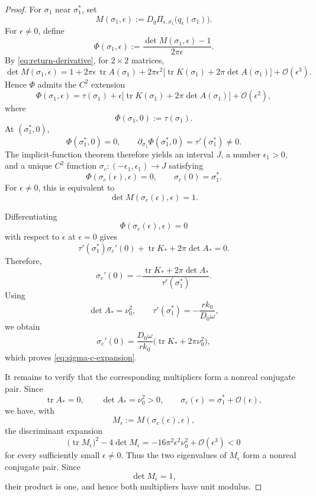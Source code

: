 \documentclass[11pt]{amsart}
\theoremstyle{remark}
\newcommand{\tr}{\operatorname{tr}}
\newcommand{\cO}{\mathcal{O}}
\begin{document}
\begin{proof}
For $\sigma_1$ near $\sigma_1^*$, set
\[
M(\sigma_1,\epsilon)
:=
D_q\Pi_{\epsilon,\sigma_1}
\bigl(q_\epsilon(\sigma_1)\bigr).
\]
For $\epsilon\ne0$, define
\[
\Phi(\sigma_1,\epsilon)
:=
\frac{\det M(\sigma_1,\epsilon)-1}{2\pi\epsilon}.
\]
By \eqref{eq:return-derivative}, for $2\times2$ matrices,
\begin{equation}
\label{eq:det-M}
\det M(\sigma_1,\epsilon)
=
1
+
2\pi\epsilon\,\tr A(\sigma_1)
+
2\pi\epsilon^2
\bigl[
\tr K(\sigma_1)+2\pi\det A(\sigma_1)
\bigr]
+
\cO(\epsilon^3).
\end{equation}
Hence $\Phi$ admits the $C^2$ extension
\begin{equation}
\label{eq:Phi}
\Phi(\sigma_1,\epsilon)
=
\tau(\sigma_1)
+
\epsilon
\bigl[
\tr K(\sigma_1)+2\pi\det A(\sigma_1)
\bigr]
+
\cO(\epsilon^2),
\end{equation}
where
\[
\Phi(\sigma_1,0):=\tau(\sigma_1).
\]
At $(\sigma_1^*,0)$,
\[
\Phi(\sigma_1^*,0)=0,
\qquad
\partial_{\sigma_1}\Phi(\sigma_1^*,0)
=
\tau'(\sigma_1^*)
\ne0.
\]
The implicit-function theorem therefore yields an interval $J$, a number
$\epsilon_1>0$, and a unique $C^2$ function
$\sigma_c:(-\epsilon_1,\epsilon_1)\to J$ satisfying
\[
\Phi(\sigma_c(\epsilon),\epsilon)=0,
\qquad
\sigma_c(0)=\sigma_1^*.
\]
For $\epsilon\ne0$, this is equivalent to
\[
\det M(\sigma_c(\epsilon),\epsilon)=1.
\]

Differentiating
\[
\Phi(\sigma_c(\epsilon),\epsilon)=0
\]
with respect to $\epsilon$ at $\epsilon=0$ gives
\[
\tau'(\sigma_1^*)\sigma_c'(0)
+
\tr K_*
+
2\pi\det A_*
=
0.
\]
Therefore,
\[
\sigma_c'(0)
=
-\frac{\tr K_*+2\pi\det A_*}
{\tau'(\sigma_1^*)}.
\]
Using
\[
\det A_*=\nu_0^2,
\qquad
\tau'(\sigma_1^*)
=
-\frac{rk_0}{D_0\omega},
\]
we obtain
\[
\sigma_c'(0)
=
\frac{D_0\omega}{rk_0}
\bigl(\tr K_*+2\pi\nu_0^2\bigr),
\]
which proves \eqref{eq:sigma-c-expansion}.

It remains to verify that the corresponding multipliers form a nonreal
conjugate pair. Since
\[
\tr A_*=0,
\qquad
\det A_*=\nu_0^2>0,
\qquad
\sigma_c(\epsilon)=\sigma_1^*+\cO(\epsilon),
\]
we have, with
\[
M_\epsilon:=M(\sigma_c(\epsilon),\epsilon),
\]
the discriminant expansion
\[
\bigl(\tr M_\epsilon\bigr)^2
-
4\det M_\epsilon
=
-16\pi^2\epsilon^2\nu_0^2
+
\cO(\epsilon^3)
<0
\]
for every sufficiently small $\epsilon\ne0$.
Thus the two eigenvalues of $M_\epsilon$ form a nonreal conjugate pair.
Since
\[
\det M_\epsilon=1,
\]
their product is one, and hence both multipliers have unit modulus.


\end{proof}
\end{document}
